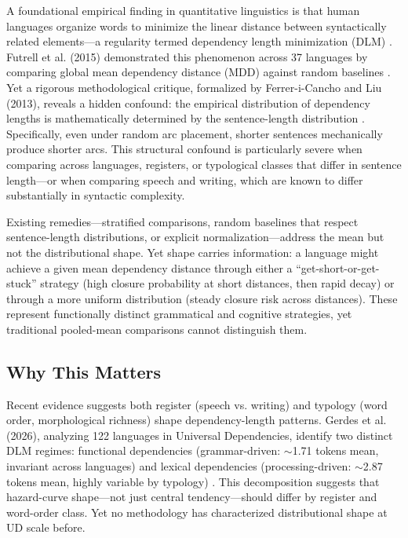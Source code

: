 \documentclass[11pt,letterpaper]{article}
\begin{document}
A foundational empirical finding in quantitative linguistics is that human languages organize words to minimize the linear distance between syntactically related elements---a regularity termed dependency length minimization (DLM) \citep{Futrell2015}. Futrell et al. (2015) demonstrated this phenomenon across 37 languages by comparing global mean dependency distance (MDD) against random baselines \citep{Futrell2015}. Yet a rigorous methodological critique, formalized by Ferrer-i-Cancho and Liu (2013), reveals a hidden confound: the empirical distribution of dependency lengths is mathematically determined by the sentence-length distribution \citep{FerreriCancho2013}. Specifically, even under random arc placement, shorter sentences mechanically produce shorter arcs. This structural confound is particularly severe when comparing across languages, registers, or typological classes that differ in sentence length---or when comparing speech and writing, which are known to differ substantially in syntactic complexity.

Existing remedies---stratified comparisons, random baselines that respect sentence-length distributions, or explicit normalization---address the mean but not the distributional shape. Yet shape carries information: a language might achieve a given mean dependency distance through either a ``get-short-or-get-stuck'' strategy (high closure probability at short distances, then rapid decay) or through a more uniform distribution (steady closure risk across distances). These represent functionally distinct grammatical and cognitive strategies, yet traditional pooled-mean comparisons cannot distinguish them.

\subsection{Why This Matters}

Recent evidence suggests both register (speech vs. writing) and typology (word order, morphological richness) shape dependency-length patterns. Gerdes et al. (2026), analyzing 122 languages in Universal Dependencies, identify two distinct DLM regimes: functional dependencies (grammar-driven: $\sim$1.71 tokens mean, invariant across languages) and lexical dependencies (processing-driven: $\sim$2.87 tokens mean, highly variable by typology) \citep{Gerdes2026}. This decomposition suggests that hazard-curve shape---not just central tendency---should differ by register and word-order class. Yet no methodology has characterized distributional shape at UD scale before.
\end{document}
